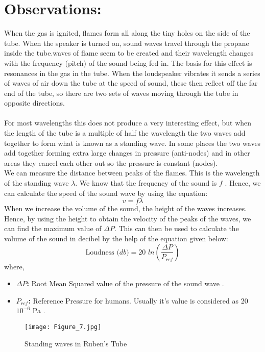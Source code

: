 \documentclass[12pt,a4paper]{article}
\begin{document}
\section{Observations:}
When the gas is ignited, flames form all along the tiny holes on the side of the tube. When the speaker is turned on, sound waves travel through the propane inside the tube.waves of flame seem to be created and their wavelength changes with the frequency (pitch) of the sound being fed in. The basis for this effect is resonances in the gas in the tube. When the loudspeaker vibrates it sends a series of waves of air down the tube at the speed of sound, these then reflect off the far end of the tube, so there are two sets of waves moving through the tube in opposite directions.\\
\\For most wavelengths this does not produce a very interesting effect, but
when the length of the tube is a multiple of half the wavelength the two waves
add together to form what is known as a standing wave. In some places the
two waves add together forming extra large changes in pressure (anti-nodes)
and in other areas they cancel each other out so the pressure is constant
(nodes).\\
\clearpage
\noindent
We can measure the distance between peaks of the flames. This is the wavelength of the standing wave $\lambda$. We know that the frequency of the sound is $f$ . Hence, we can calculate the speed of the sound wave by using the equation:
\begin{equation}
    \text{$v$} = \text{$f$} \text{$\lambda$}
\end{equation}
When we increase the volume of the sound, the height of the waves increases. Hence, by using the height to obtain the velocity of the peaks of the waves, we can find the maximum value of $\Delta P$. This can then be used to calculate the volume of the sound in decibel by the help of the equation given below:
\begin{equation}
    \text{Loudness ($db$)} = \text{20 $ln$}(\frac{\Delta P}{P_{ref}})
\end{equation}
where, 
\begin{itemize}
\item \textbf{$\Delta P$:} Root Mean Squared value of the pressure of the sound wave .
\item \textbf{$P_{ref}$:} Reference Pressure for humans. Usually it's value is considered as 20 \times $10^{-6}$ Pa .
\end{itemize}
\begin{figure}[!ht]
	\begin{center}
		\texttt{[image: Figure\_7.jpg]}
	\end{center}
	\caption{Standing waves in Ruben’s Tube}
\end{figure}
\end{document}
